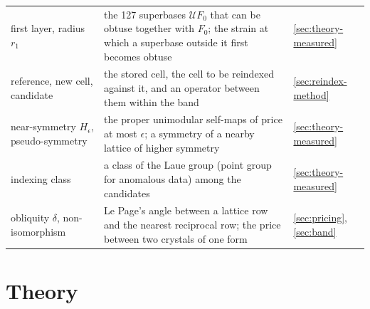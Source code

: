 \begin{widetable}
\begin{footnotesize}
\begin{tabular}{>{\raggedright\arraybackslash}p{4.0cm}>{\raggedright\arraybackslash}p{12.3cm}l}
first layer, radius $r_1$ & the 127 superbases $\mathcal UF_0$ that can be obtuse together with $F_0$; the strain at which a superbase outside it first becomes obtuse & \ref{sec:theory-measured} \\
reference, new cell, candidate & the stored cell, the cell to be reindexed against it, and an operator between them within the band & \ref{sec:reindex-method} \\
near-symmetry $H_\epsilon$, pseudo-symmetry & the proper unimodular self-maps of price at most $\epsilon$; a symmetry of a nearby lattice of higher symmetry & \ref{sec:theory-measured} \\
indexing class & a class of the Laue group (point group for anomalous data) among the candidates & \ref{sec:theory-measured} \\
obliquity $\delta$, non-isomorphism & Le Page's angle between a lattice row and the nearest reciprocal row; the price between two crystals of one form & \ref{sec:pricing}, \ref{sec:band} \\
\bottomrule
\end{tabular}
\end{footnotesize}
\end{widetable}

\section{Theory}\label{sec:closure}

